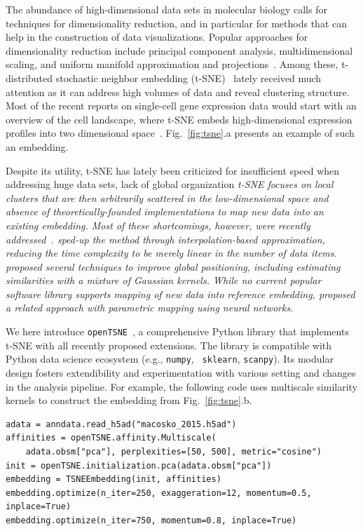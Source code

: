 \documentclass{bioinfo}
\newcommand{\opentsne}[0]{{\tt openTSNE}\ }
\begin{document}
The abundance of high-dimensional data sets in molecular biology calls for
techniques for dimensionality reduction, and in particular for methods that can
help in the construction of data visualizations. Popular approaches for
dimensionality reduction include principal component analysis, multidimensional
scaling, and uniform manifold approximation and projections~\citep{umap}. Among
these, t-distributed stochastic neighbor embedding
(t-SNE)~\citep{tsne} lately received much attention as it can
address high volumes of data and reveal clustering structure. Most
of the recent reports on single-cell gene expression data would start with an
overview of the cell landscape, where t-SNE embeds high-dimensional expression
profiles into two dimensional space~\citep{Macosko2015, Shekhar2016}.
Fig.~\ref{fig:tsne}.a presents an example of such an embedding.

Despite its utility, t-SNE has lately been criticized for insufficient speed
when addressing huge data sets, lack of global organization \em t-SNE
focuses on local clusters that are then arbitrarily scattered in the
low-dimensional space \em and absence of theoretically-founded implementations to
map new data into an existing embedding. Most of these shortcomings, however, were
recently addressed~\citep{ding2018interpretable,becht2019dimensionality}.
\citet{fi_tsne} sped-up the method through interpolation-based
approximation, reducing the time complexity to be merely linear
in the number of data items. \citet{art_of_using_tsne} proposed
several techniques to improve global positioning, including estimating similarities with a mixture of
Gaussian kernels. While no current popular
software library supports mapping of new data into reference embedding,
\citet{parametric_tsne} proposed a related approach with parametric mapping
using neural networks.

We here introduce \opentsne, a comprehensive Python library that
implements t-SNE with all recently proposed extensions. The library is
compatible with Python data science ecosystem (e.g., {\tt numpy}, {\tt
sklearn}, {\tt scanpy}). Its modular design fosters extendibility and
experimentation with various setting and changes in the analysis pipeline. For
example, the following code uses multiscale similarity kernels to construct the
embedding from Fig.~\ref{fig:tsne}.b.

\begin{lstlisting}
adata = anndata.read_h5ad("macosko_2015.h5ad")
affinities = openTSNE.affinity.Multiscale(
	adata.obsm["pca"], perplexities=[50, 500], metric="cosine")
init = openTSNE.initialization.pca(adata.obsm["pca"])
embedding = TSNEEmbedding(init, affinities)
embedding.optimize(n_iter=250, exaggeration=12, momentum=0.5, inplace=True)
embedding.optimize(n_iter=750, momentum=0.8, inplace=True)
\end{lstlisting}
\end{document}
